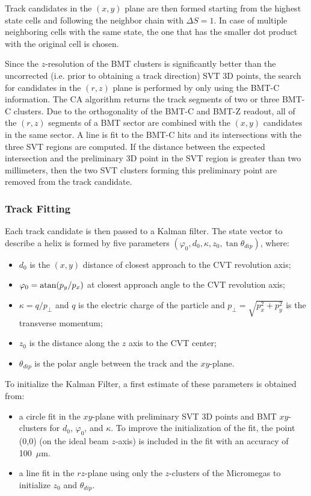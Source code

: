 Track candidates in the $(x,y)$ plane are then formed starting from the highest state cells and following the
neighbor chain with $\Delta S = 1$. In case of multiple neighboring cells with the same state, the one that has
the smaller dot product with the original cell is chosen.

Since the $z$-resolution of the BMT clusters is significantly better than the uncorrected (i.e. prior to obtaining a
track direction)  SVT 3D points, the search for candidates in the $(r,z)$ plane is performed by only using the
BMT-C information. The CA algorithm returns the track segments of two or three BMT-C clusters. Due to the
orthogonality of the BMT-C and BMT-Z readout, all of the $(r,z)$ segments of a BMT sector are combined with
the $(x,y)$ candidates in the same sector. A line is fit to the BMT-C hits and its intersections with the three
SVT regions are computed. If the distance between the expected intersection and the preliminary 3D point in the
SVT region is greater than two millimeters, then the two SVT clusters forming this preliminary point are removed
from the track candidate.

\subsubsection{Track Fitting}

Each track candidate is then passed to a Kalman filter. The state vector to describe a helix is formed by five
parameters $(\varphi_0, d_0, \kappa, z_0, \tan \theta_{dip})$, where:

\begin{itemize}
\item $d_0$ is the $(x,y)$ distance of closest approach to the CVT revolution axis;
\item $\varphi_0 = {\rm atan}(p_y/p_x)$ at closest approach angle to the CVT revolution axis;
\item $\kappa=q/p_\perp$ and $q$ is the electric charge of the particle and $p_\perp=\sqrt{p_x^2+p_y^2}$ is
  the transverse momentum;
\item $z_0$ is the distance along the $z$ axis to the CVT center;
\item $\theta_{dip}$ is the polar angle between the track and the $xy$-plane.
\end{itemize}

To initialize the Kalman Filter, a first estimate of these parameters is obtained from:

\begin{itemize}
\item a circle fit in the $xy$-plane with preliminary SVT 3D points and BMT $xy$-clusters for $d_0$,
  $\varphi_0$, and $\kappa$. To improve the initialization of the fit, the point (0,0) (on the ideal beam $z$-axis)
  is included in the fit with an accuracy of 100~$\mu$m.
\item a line fit in the $rz$-plane using only the $z$-clusters of the Micromegas to initialize $z_0$ and $\theta_{dip}$.
\end{itemize}

